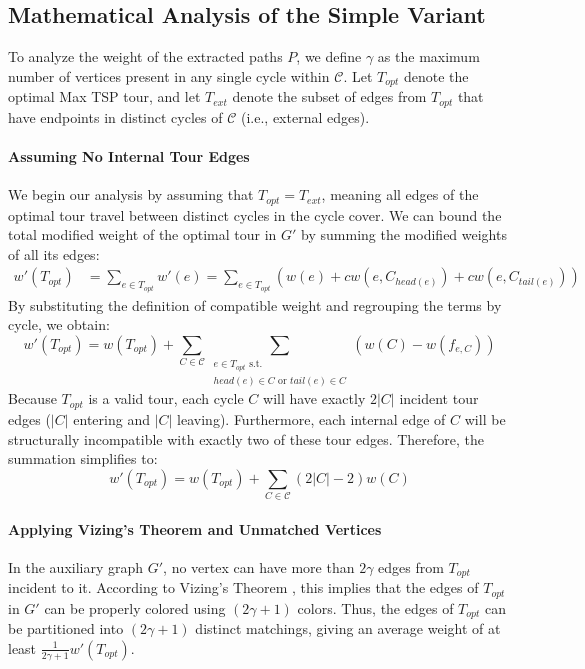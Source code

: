\subsection{Mathematical Analysis of the Simple Variant}

To analyze the weight of the extracted paths $P$, we define $\gamma$ as the
maximum number of vertices present in any single cycle within $\mathcal{C}$. Let
$T_{opt}$ denote the optimal Max TSP tour, and let $T_{ext}$ denote the subset
of edges from $T_{opt}$ that have endpoints in distinct cycles of $\mathcal{C}$
(i.e., external edges).

\paragraph{Assuming No Internal Tour Edges}
We begin our analysis by assuming that $T_{opt} = T_{ext}$, meaning all edges of
the optimal tour travel between distinct cycles in the cycle cover. We can bound
the total modified weight of the optimal tour in $G'$ by summing the modified
weights of all its edges:
\begin{align*}
w'(T_{opt}) &= \sum_{e \in T_{opt}} w'(e) = \sum_{e \in T_{opt}} \left( w(e) + cw(e, C_{head(e)}) + cw(e, C_{tail(e)}) \right)
\end{align*}
By substituting the definition of compatible weight and regrouping the terms by
cycle, we obtain:
$$ w'(T_{opt}) = w(T_{opt}) + \sum_{C \in \mathcal{C}} \sum_{\substack{e \in
T_{opt} \text{ s.t.} \\ head(e) \in C \text{ or } tail(e) \in C}} (w(C) -
w(f_{e, C})) $$
Because $T_{opt}$ is a valid tour, each cycle $C$ will have exactly $2|C|$
incident tour edges ($|C|$ entering and $|C|$ leaving). Furthermore, each
internal edge of $C$ will be structurally incompatible with exactly two of these
tour edges. Therefore, the summation simplifies to:
$$ w'(T_{opt}) = w(T_{opt}) + \sum_{C \in \mathcal{C}} (2|C| - 2)w(C) $$

\paragraph{Applying Vizing's Theorem and Unmatched Vertices}
In the auxiliary graph $G'$, no vertex can have more than $2\gamma$ edges from
$T_{opt}$ incident to it. According to Vizing's Theorem
\cite{vizing1964estimate}, this implies that the edges of $T_{opt}$ in $G'$ can
be properly colored using $(2\gamma + 1)$ colors. Thus, the edges of $T_{opt}$
can be partitioned into $(2\gamma + 1)$ distinct matchings, giving an average
weight of at least $\frac{1}{2\gamma + 1}w'(T_{opt})$.

